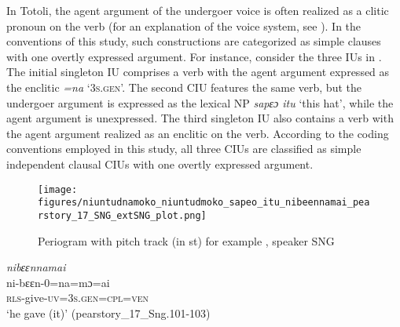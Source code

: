 In Totoli, the agent argument of the undergoer voice is often realized as a clitic pronoun on the verb (for an explanation of the voice system, see \cite{Riesberg_2019, Riesberg_2014_Symmetrical_Voice}). In the conventions of this study, such constructions are categorized as simple clauses with one overtly expressed argument. For instance, consider the three IUs in . The initial singleton IU  comprises a verb with the agent argument expressed as the enclitic \textit{=na} `\textsc{3s.gen}'. The second CIU 	 features the same verb, but the undergoer argument is expressed as the lexical NP \textit{sapɛɔ itu} `this hat', while the agent argument is unexpressed. The third singleton IU  also contains a verb with the agent argument realized as an enclitic on the verb. According to the coding conventions employed in this study, all three CIUs are classified as simple independent clausal CIUs with one overtly expressed argument.


\begin{figure}
	\texttt{[image: figures/niuntudnamoko\_niuntudmoko\_sapeo\_itu\_nibeennamai\_pearstory\_17\_SNG\_extSNG\_plot.png]}
	\caption{Periogram with pitch track (in st) for example , speaker SNG}
	\label{pitch:niuntudnamoko sapeo itu nibeen}
\end{figure}


\ea
\label{ex:niuntudnamoko sapeo itu nibeen}


\newpage

{
	\ex
	\label{ex:nibeennamai}
	\textit{nibɛɛnnamai} \\
	\gll  ni-bɛɛn-0=na=mɔ=ai\\
	\textsc{rls}-give-\textsc{uv}=3\textsc{s}.\textsc{gen}=\textsc{cpl}=\textsc{ven}\\
	\glt `he gave (it)'
	\hfill(pearstory\_17\_Sng.101-103)
}
\z
\z



